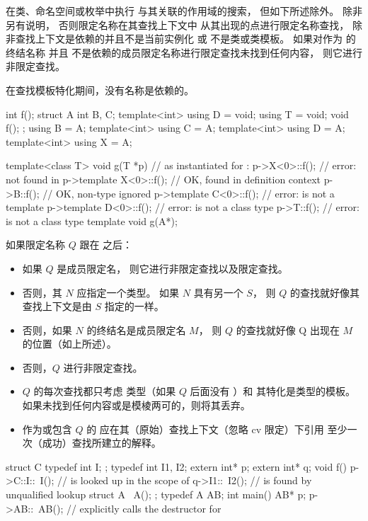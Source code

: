 \pnum
{}
在类、命名空间或枚举中执行
与其关联的作用域的搜索，
但如下所述除外。
除非另有说明，
否则限定名称在其查找上下文中
从其出现的点进行限定名称查找，
除非查找上下文是依赖的并且不是当前实例化 或
不是类或类模板。
如果对作为  的终结名称 并且
不是依赖的成员限定名称进行限定查找未找到任何内容，
则它进行非限定查找。
\begin{note}
在查找模板特化期间，没有名称是依赖的。
\end{note}
\begin{example}
\begin{codeblock}
int f();
struct A {
  int B, C;
  template<int> using D = void;
  using T = void;
  void f();
};
using B = A;
template<int> using C = A;
template<int> using D = A;
template<int> using X = A;

template<class T>
void g(T *p) {                  // as instantiated for :
  p->X<0>::f();                 // error:  not found in 
  p->template X<0>::f();        // OK,  found in definition context
  p->B::f();                    // OK, non-type  ignored
  p->template C<0>::f();        // error:  is not a template
  p->template D<0>::f();        // error:  is not a class type
  p->T::f();                    // error:  is not a class type
}
template void g(A*);
\end{codeblock}
\end{example}

\pnum
如果限定名称 $Q$ 跟在 \tcode{\~} 之后：
\begin{itemize}
\item
如果 $Q$ 是成员限定名，
则它进行非限定查找以及限定查找。
\item
否则，其  $N$ 应指定一个类型。
如果 $N$ 具有另一个  $S$，
则 $Q$ 的查找就好像其查找上下文是由 $S$ 指定的一样。
\item
否则，如果 $N$ 的终结名是成员限定名 $M$，
则 $Q$ 的查找就好像 \tcode{\~}Q 出现在 $M$ 的位置（如上所述）。
\item
否则，$Q$ 进行非限定查找。
\item
$Q$ 的每次查找都只考虑
类型（如果 $Q$ 后面没有 \tcode{<}）和
其特化是类型的模板。
如果未找到任何内容或是模棱两可的，则将其丢弃。
\item
作为或包含 $Q$ 的 
应在其（原始）查找上下文（忽略 cv 限定）下引用
至少一次（成功）查找所建立的解释。
\end{itemize}
\begin{example}
\begin{codeblock}
struct C {
  typedef int I;
};
typedef int I1, I2;
extern int* p;
extern int* q;
void f() {
  p->C::I::~I();        //  is looked up in the scope of 
  q->I1::~I2();         //  is found by unqualified lookup
}
struct A {
  ~A();
};
typedef A AB;
int main() {
  AB* p;
  p->AB::~AB();         // explicitly calls the destructor for 
}
\end{codeblock}
\end{example}

